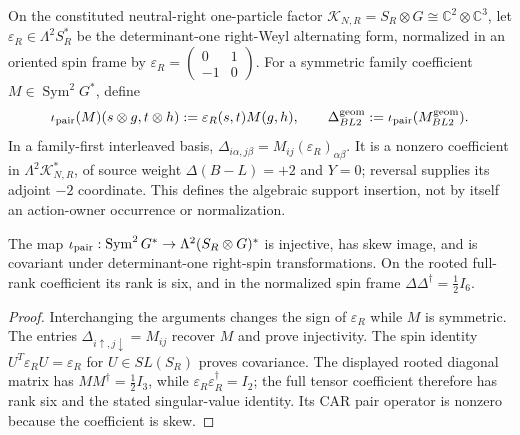 \documentclass[12pt,a4paper]{article}
\begin{document}
\begin{definition}
\label{p5:def:v3105-rooted-bl2-pair-member}
On the constituted neutral-right one-particle factor
$\mathcal K_{N,R}=S_R\otimes G\cong\mathbb C^2\otimes\mathbb C^3$,
let $\varepsilon_R\in\Lambda^2 S_R^*$ be the determinant-one right-Weyl
alternating form, normalized in an oriented spin frame by
$\varepsilon_R=\left(\begin{smallmatrix}0&1\\-1&0\end{smallmatrix}\right)$.
For a symmetric family coefficient $M\in\operatorname{Sym}^2G^*$, define
\[
 \iota_{\rm pair}(M)(s\otimes g,t\otimes h)
 :=\varepsilon_R(s,t)M(g,h),\qquad
 \Delta_{BL2}^{\rm geom}:=\iota_{\rm pair}(M_{BL2}^{\rm geom}).
\]
In a family-first interleaved basis,
$\Delta_{i\alpha,j\beta}=M_{ij}(\varepsilon_R)_{\alpha\beta}$.
It is a nonzero coefficient in $\Lambda^2\mathcal K_{N,R}^*$, of source
weight $\Delta(B-L)=+2$ and $Y=0$; reversal supplies its adjoint $-2$
coordinate. This defines the algebraic support insertion, not by itself an
action-owner occurrence or normalization.
\end{definition}
\begin{proposition}
\label{p5:prop:v382-majorana-car-spinor-intertwiner}
The map $\iota_{\rm pair}:\operatorname{Sym}^2G^*\to
\Lambda^2(S_R\otimes G)^*$ is injective, has skew image, and is
covariant under determinant-one right-spin transformations. On the rooted
full-rank coefficient its rank is six, and in the normalized spin frame
$\Delta\Delta^\dagger=\frac12 I_6$.
\end{proposition}
\begin{proof}
Interchanging the arguments changes the sign of $\varepsilon_R$ while
$M$ is symmetric. The entries $\Delta_{i\uparrow,j\downarrow}=M_{ij}$
recover $M$ and prove injectivity. The spin identity
$U^T\varepsilon_R U=\varepsilon_R$ for $U\in SL(S_R)$ proves covariance.
The displayed rooted diagonal matrix has
$MM^\dagger=\frac12I_3$, while
$\varepsilon_R\varepsilon_R^\dagger=I_2$; the full tensor coefficient
therefore has rank six and the stated singular-value identity.
Its CAR pair operator is nonzero because the coefficient is skew.
\end{proof}
\end{document}

